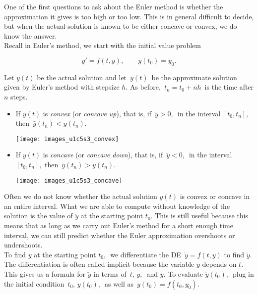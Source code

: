 \clearpage

One of the first questions to ask about the Euler method is
whether the approximation it gives is too high or too low.
This is in general difficult to decide,
but when the actual solution is known to be either concave or convex, we do know the answer. \\

Recall in Euler's method, we start with the initial value problem

\begin{equation*}
  y' = f(t,y), \qquad y(t_0) = y_0. 
\end{equation*}

Let $y(t)$ be the actual solution and let $\, \bar{y}(t)\,$
be the approximate solution given by Euler's method with stepsize $h$.
As before, $\, t_n = t_0 + nh \,$ is the time after $n$ steps.
\begin{itemize}
\item If $y(t)$ is \emph{convex} (or \emph{concave up}), that is,
  if $\, \ddot y > 0,\,$ in the interval $[t_0 , t_n],$ then
  $\, \bar{y}(t_ n)< y(t_ n)$.

  \texttt{[image: images\_u1c5s3\_convex]}

\item If $y(t)$ is \emph{concave} (or \emph{concave down}), that is,
  if $\, \ddot y < 0,\,$ in the interval $[t_0 , t_n],$ then
  $\, \bar{y}(t_ n) > y(t_ n)$.

  \texttt{[image: images\_u1c5s3\_concave]}
  
\end{itemize}

Often we do not know whether the actual solution $y(t)$ is convex or concave
in an entire interval.
What we are able to compute without knowledge of the solution is the value of $\ddot y$
at the starting point $t_0$.
This is still useful because this means that as long as we carry out Euler's method
for a short enough time interval,
we can still predict whether the Euler approximation overshoots or undershoots. \\

To find $\ddot y$ at the starting point $t_0,\,$
we differentiate the DE $\, \dot y = f(t,y)$ to find $\ddot y$.
The differentiation is often called implicit because the variable $y$ depends on $t$.
This gives us a formula for $\ddot y$ in terms of $\, t,\, y, \,$ and $\dot y$.
To evaluate $\ddot y(t_0),\,$ plug in the initial condition
$\, t_0,\, y(t_0),\,$ as well as $\, \dot y(t_0) = f(t_0,y_0)$.

